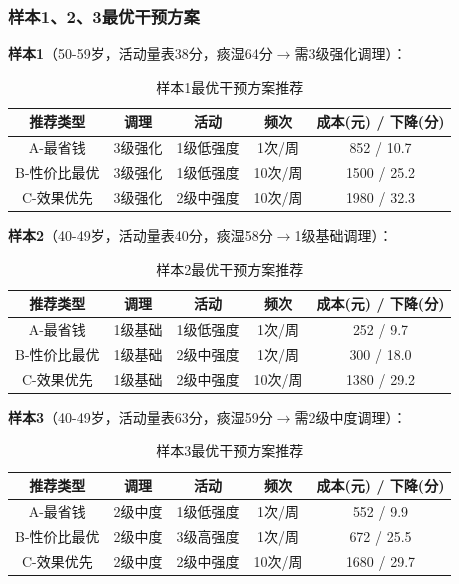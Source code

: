 \documentclass[12pt,a4paper]{ctexart}
\begin{document}
\subsubsection{样本1、2、3最优干预方案}

\textbf{样本1}（50-59岁，活动量表38分，痰湿64分$\rightarrow$需3级强化调理）：

\begin{table}[H]
\centering
\begin{tabular}{ccccc}
\toprule
\textbf{推荐类型} & \textbf{调理} & \textbf{活动} & \textbf{频次} & \textbf{成本(元) / 下降(分)} \\
\midrule
A-最省钱 & 3级强化 & 1级低强度 & 1次/周 & 852 / 10.7 \\
B-性价比最优 & 3级强化 & 1级低强度 & 10次/周 & 1500 / 25.2 \\
C-效果优先 & 3级强化 & 2级中强度 & 10次/周 & 1980 / 32.3 \\
\bottomrule
\end{tabular}
\caption{样本1最优干预方案推荐}
\end{table}

\textbf{样本2}（40-49岁，活动量表40分，痰湿58分$\rightarrow$1级基础调理）：

\begin{table}[H]
\centering
\begin{tabular}{ccccc}
\toprule
\textbf{推荐类型} & \textbf{调理} & \textbf{活动} & \textbf{频次} & \textbf{成本(元) / 下降(分)} \\
\midrule
A-最省钱 & 1级基础 & 1级低强度 & 1次/周 & 252 / 9.7 \\
B-性价比最优 & 1级基础 & 2级中强度 & 1次/周 & 300 / 18.0 \\
C-效果优先 & 1级基础 & 2级中强度 & 10次/周 & 1380 / 29.2 \\
\bottomrule
\end{tabular}
\caption{样本2最优干预方案推荐}
\end{table}

\textbf{样本3}（40-49岁，活动量表63分，痰湿59分$\rightarrow$需2级中度调理）：

\begin{table}[H]
\centering
\begin{tabular}{ccccc}
\toprule
\textbf{推荐类型} & \textbf{调理} & \textbf{活动} & \textbf{频次} & \textbf{成本(元) / 下降(分)} \\
\midrule
A-最省钱 & 2级中度 & 1级低强度 & 1次/周 & 552 / 9.9 \\
B-性价比最优 & 2级中度 & 3级高强度 & 1次/周 & 672 / 25.5 \\
C-效果优先 & 2级中度 & 2级中强度 & 10次/周 & 1680 / 29.7 \\
\bottomrule
\end{tabular}
\caption{样本3最优干预方案推荐}
\end{table}
\end{document}
